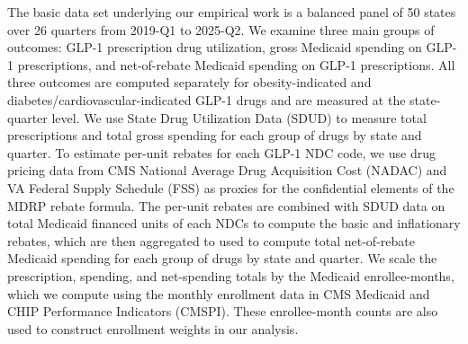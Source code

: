 The basic data set underlying our empirical work is a balanced panel of 50 states over 26 quarters from 2019-Q1 to 2025-Q2. We examine three main groups of outcomes: GLP-1 prescription drug utilization, gross Medicaid spending on GLP-1 prescriptions, and net-of-rebate Medicaid spending on GLP-1 prescriptions. All three outcomes are computed separately for obesity-indicated and diabetes/cardiovascular-indicated GLP-1 drugs and are measured at the state-quarter level. We use State Drug Utilization Data (SDUD) to measure total prescriptions and total gross spending for each group of drugs by state and quarter. To estimate per-unit rebates for each GLP-1 NDC code, we use drug pricing data from CMS National Average Drug Acquisition Cost (NADAC) and VA Federal Supply Schedule (FSS) as proxies for the confidential elements of the MDRP rebate formula.  The per-unit rebates are combined with SDUD data on total Medicaid financed units of each NDCs to compute the basic and inflationary rebates, which are then aggregated to used to compute total net-of-rebate Medicaid spending for each group of drugs by state and quarter. We scale the prescription, spending, and net-spending totals by the Medicaid enrollee-months, which we compute using the monthly enrollment data in CMS Medicaid and CHIP Performance Indicators (CMSPI). These enrollee-month counts are also used to construct enrollment weights in our analysis.

